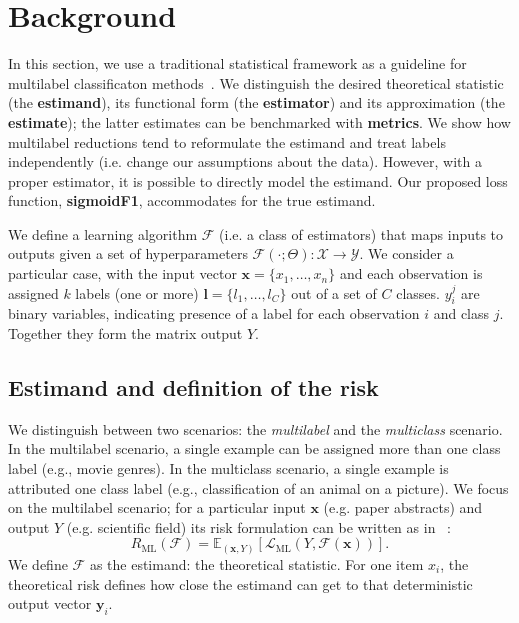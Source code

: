 
\section{Background}
\label{section:background}

In this section, we use a traditional statistical framework as a guideline for multilabel classificaton methods~\citep{tukey}. We distinguish the desired theoretical statistic (the \textbf{estimand}), its functional form (the \textbf{estimator}) and its approximation (the \textbf{estimate}); the latter estimates can be benchmarked with \textbf{metrics}. We show how multilabel reductions tend to reformulate the estimand and treat labels independently (i.e. change our assumptions about the data). However, with a proper estimator, it is possible to directly model the estimand. Our proposed loss function, \textbf{sigmoidF1}, accommodates for the true estimand.

We define a learning algorithm $\mathcal{F}$ (i.e. a class of estimators) that maps inputs to outputs given a set of hyperparameters \(\mathcal{F}(\cdot ; \Theta): \mathcal{X} \rightarrow \mathcal{Y}\). We consider a particular case, with the input vector \(\mathbf{x} = \{x_1, \ldots, x_n\}\) and each observation is assigned $k$ labels (one or more) \(\mathbf{l} = \{l_1, \ldots, l_C\}\) out of a set of $C$ classes. \(y_{i}^{j}\) are binary variables, indicating presence of a label for each observation \(i\) and class \(j\). Together they form the matrix output $Y$.

\subsection{Estimand and definition of the risk}
\label{section:background:estimand}

We distinguish between two scenarios: the \emph{multilabel} and the \emph{multiclass} scenario. 
In the multilabel scenario, a single example can be assigned more than one class label (e.g., movie genres). 
In the multiclass scenario, a single example is attributed one class label (e.g., classification of an animal on a picture). 
We focus on the multilabel scenario; for a particular input $\mathbf{x}$ (e.g. paper abstracts) and output $Y$ (e.g. scientific field) its risk formulation can be written as in ~\citep{multilabelReduction}:
%
\begin{equation}
R_{\mathrm{ML}}(\mathcal{F}) = \mathbb{E}_{(\mathbf{x}, Y)}\left[\mathcal{L}_{\mathrm{ML}}(Y, \mathcal{F}(\mathbf{x}))\right].
\end{equation}
%
We define $\mathcal{F}$ as the estimand: the theoretical statistic. For one item $x_i$, the theoretical risk defines how close the estimand can get to that deterministic output vector $\mathbf{y}_{i}$.

